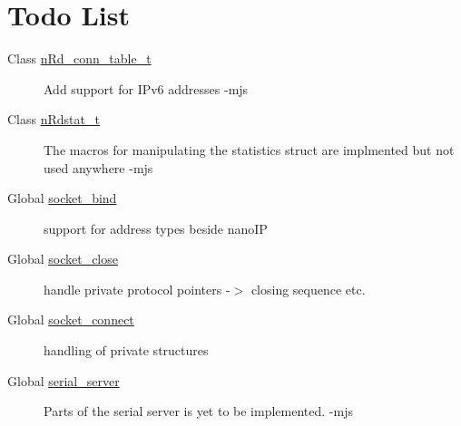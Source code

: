 \hypertarget{todo}{}\section{Todo List}\label{todo}
\label{todo__todo000008}
\hypertarget{todo__todo000008}{}
 \begin{description}
\item[Class \hyperlink{structnRd__conn__table__t}{n\-Rd\_\-conn\_\-table\_\-t} ]Add support for IPv6 addresses -mjs \end{description}


\label{todo__todo000007}
\hypertarget{todo__todo000007}{}
 \begin{description}
\item[Class \hyperlink{structnRdstat__t}{n\-Rdstat\_\-t} ]The macros for manipulating the statistics struct are implmented but not used anywhere -mjs \end{description}


\label{todo__todo000002}
\hypertarget{todo__todo000002}{}
 \begin{description}
\item[Global \hyperlink{socket_8h_005740d957ab5d95ffb1448079c18c5f}{socket\_\-bind} ]support for address types beside nano\-IP

\end{description}


\label{todo__todo000001}
\hypertarget{todo__todo000001}{}
 \begin{description}
\item[Global \hyperlink{socket_8h_14f3b4a63186d93cd3ddb1f2a4120377}{socket\_\-close} ]handle private protocol pointers -$>$ closing sequence etc.

\end{description}


\label{todo__todo000003}
\hypertarget{todo__todo000003}{}
 \begin{description}
\item[Global \hyperlink{socket_8h_73cfc659f1503e0cf5773933b972944e}{socket\_\-connect} ]handling of private structures

\end{description}


\label{todo__todo000010}
\hypertarget{todo__todo000010}{}
 \begin{description}
\item[Global \hyperlink{nRouted_8c_40aea12bcf55afc06ed55efe9fc41e9b}{serial\_\-server} ]Parts of the serial server is yet to be implemented. -mjs \end{description}


